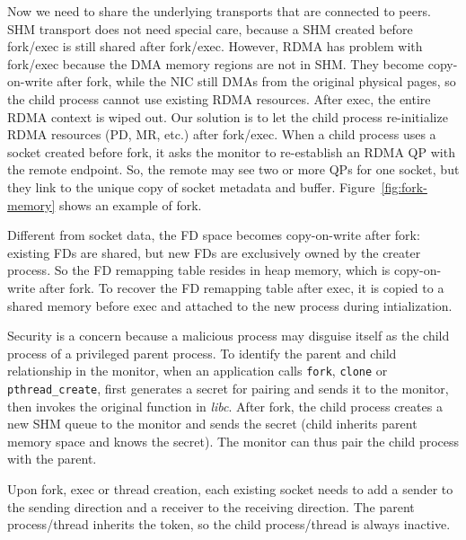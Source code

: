 Now we need to share the underlying transports that are connected to peers.
SHM transport does not need special care, because a SHM created before fork/exec is still shared after fork/exec.
However, RDMA has problem with fork/exec because the DMA memory regions are not in SHM.
They become copy-on-write after fork, while the NIC still DMAs from the original physical pages, so the child process cannot use existing RDMA resources.
After exec, the entire RDMA context is wiped out.
Our solution is to let the child process re-initialize RDMA resources (PD, MR, etc.) after fork/exec.
When a child process uses a socket created before fork, it asks the monitor to re-establish an RDMA QP with the remote endpoint.
So, the remote may see two or more QPs for one socket, but they link to the unique copy of socket metadata and buffer.
Figure~\ref{fig:fork-memory} shows an example of fork.

Different from socket data, the FD space becomes copy-on-write after fork: existing FDs are shared, but new FDs are exclusively owned by the creater process.
So the FD remapping table resides in heap memory, which is copy-on-write after fork.
To recover the FD remapping table after exec, it is copied to a shared memory before exec and attached to the new process during \libipc{} intialization.

Security is a concern because a malicious process may disguise itself as the child process of a privileged parent process.
To identify the parent and child relationship in the monitor, when an application calls \texttt{fork}, \texttt{clone} or \texttt{pthread\_create}, \libipc{} first generates a secret for pairing and sends it to the monitor, then invokes the original function in \emph{libc}.
After fork, the child process creates a new SHM queue to the monitor and sends the secret (child inherits parent memory space and knows the secret).
The monitor can thus pair the child process with the parent.

Upon fork, exec or thread creation, each existing socket needs to add a sender to the sending direction and a receiver to the receiving direction.
The parent process/thread inherits the token, so the child process/thread is always inactive.


